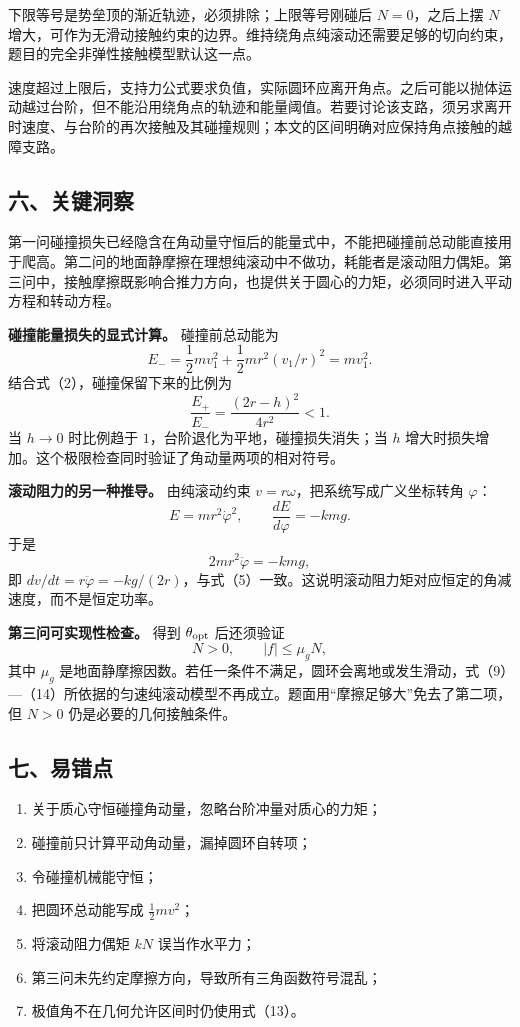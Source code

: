 \documentclass[12pt,a4paper,UTF8]{ctexart}
\newcommand{\tightlist}{\setlength{\itemsep}{0pt}\setlength{\parskip}{0pt}}
\begin{document}
下限等号是势垒顶的渐近轨迹，必须排除；上限等号刚碰后 \(N=0\)，之后上摆
\(N\)
增大，可作为无滑动接触约束的边界。维持绕角点纯滚动还需要足够的切向约束，题目的完全非弹性接触模型默认这一点。

速度超过上限后，支持力公式要求负值，实际圆环应离开角点。之后可能以抛体运动越过台阶，但不能沿用绕角点的轨迹和能量阈值。若要讨论该支路，须另求离开时速度、与台阶的再次接触及其碰撞规则；本文的区间明确对应保持角点接触的越障支路。

\subsection{六、关键洞察}\label{ux516dux5173ux952eux6d1eux5bdf-3}

第一问碰撞损失已经隐含在角动量守恒后的能量式中，不能把碰撞前总动能直接用于爬高。第二问的地面静摩擦在理想纯滚动中不做功，耗能者是滚动阻力偶矩。第三问中，接触摩擦既影响合推力方向，也提供关于圆心的力矩，必须同时进入平动方程和转动方程。

\textbf{碰撞能量损失的显式计算。} 碰撞前总动能为 \[
E_-=\frac12mv_1^2+\frac12mr^2(v_1/r)^2=mv_1^2.
\] 结合式（2），碰撞保留下来的比例为 \[
\frac{E_+}{E_-}=\frac{(2r-h)^2}{4r^2}<1.
\] 当 \(h\to0\) 时比例趋于 \(1\)，台阶退化为平地，碰撞损失消失；当 \(h\)
增大时损失增加。这个极限检查同时验证了角动量两项的相对符号。

\textbf{滚动阻力的另一种推导。} 由纯滚动约束
\(v=r\omega\)，把系统写成广义坐标转角 \(\varphi\)： \[
E=mr^2\dot\varphi^2,\qquad
\frac{dE}{d\varphi}=-kmg.
\] 于是 \[
2mr^2\ddot\varphi=-kmg,
\] 即
\(dv/dt=r\ddot\varphi=-kg/(2r)\)，与式（5）一致。这说明滚动阻力矩对应恒定的角减速度，而不是恒定功率。

\textbf{第三问可实现性检查。} 得到 \(\theta_{\rm opt}\) 后还须验证 \[
N>0,\qquad |f|\le\mu_gN,
\] 其中 \(\mu_g\)
是地面静摩擦因数。若任一条件不满足，圆环会离地或发生滑动，式（9）---（14）所依据的匀速纯滚动模型不再成立。题面用``摩擦足够大''免去了第二项，但
\(N>0\) 仍是必要的几何接触条件。

\subsection{七、易错点}\label{ux4e03ux6613ux9519ux70b9-3}

\begin{enumerate}
\def\labelenumi{\arabic{enumi}.}
\tightlist
\item
  关于质心守恒碰撞角动量，忽略台阶冲量对质心的力矩；
\item
  碰撞前只计算平动角动量，漏掉圆环自转项；
\item
  令碰撞机械能守恒；
\item
  把圆环总动能写成 \(\tfrac12mv^2\)；
\item
  将滚动阻力偶矩 \(kN\) 误当作水平力；
\item
  第三问未先约定摩擦方向，导致所有三角函数符号混乱；
\item
  极值角不在几何允许区间时仍使用式（13）。
\end{enumerate}
\end{document}
